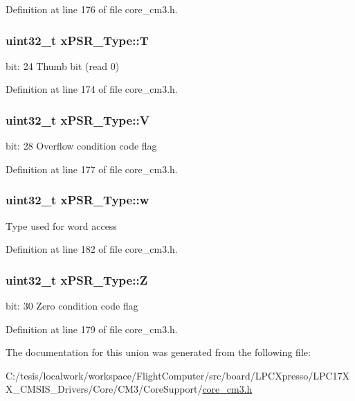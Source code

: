\-Definition at line 176 of file core\-\_\-cm3.\-h.

\hypertarget{unionx_p_s_r___type_a7eed9fe24ae8d354cd76ae1c1110a658}{
\subsubsection[{\-T}]{\setlength{\rightskip}{0pt plus 5cm}uint32\-\_\-t {\bf x\-P\-S\-R\-\_\-\-Type\-::\-T}}}\label{unionx_p_s_r___type_a7eed9fe24ae8d354cd76ae1c1110a658}
bit\-: 24 \-Thumb bit (read 0) 

\-Definition at line 174 of file core\-\_\-cm3.\-h.

\hypertarget{unionx_p_s_r___type_af14df16ea0690070c45b95f2116b7a0a}{
\subsubsection[{\-V}]{\setlength{\rightskip}{0pt plus 5cm}uint32\-\_\-t {\bf x\-P\-S\-R\-\_\-\-Type\-::\-V}}}\label{unionx_p_s_r___type_af14df16ea0690070c45b95f2116b7a0a}
bit\-: 28 \-Overflow condition code flag 

\-Definition at line 177 of file core\-\_\-cm3.\-h.

\hypertarget{unionx_p_s_r___type_a1a47176768f45f79076c4f5b1b534bc2}{
\subsubsection[{w}]{\setlength{\rightskip}{0pt plus 5cm}uint32\-\_\-t {\bf x\-P\-S\-R\-\_\-\-Type\-::w}}}\label{unionx_p_s_r___type_a1a47176768f45f79076c4f5b1b534bc2}
\-Type used for word access 

\-Definition at line 182 of file core\-\_\-cm3.\-h.

\hypertarget{unionx_p_s_r___type_a1e5d9801013d5146f2e02d9b7b3da562}{
\subsubsection[{\-Z}]{\setlength{\rightskip}{0pt plus 5cm}uint32\-\_\-t {\bf x\-P\-S\-R\-\_\-\-Type\-::\-Z}}}\label{unionx_p_s_r___type_a1e5d9801013d5146f2e02d9b7b3da562}
bit\-: 30 \-Zero condition code flag 

\-Definition at line 179 of file core\-\_\-cm3.\-h.



\-The documentation for this union was generated from the following file\-:\begin{DoxyCompactItemize}
\item 
\-C\-:/tesis/localwork/workspace/\-Flight\-Computer/src/board/\-L\-P\-C\-Xpresso/\-L\-P\-C17\-X\-X\-\_\-\-C\-M\-S\-I\-S\-\_\-\-Drivers/\-Core/\-C\-M3/\-Core\-Support/\hyperlink{core__cm3_8h}{core\-\_\-cm3.\-h}\end{DoxyCompactItemize}
